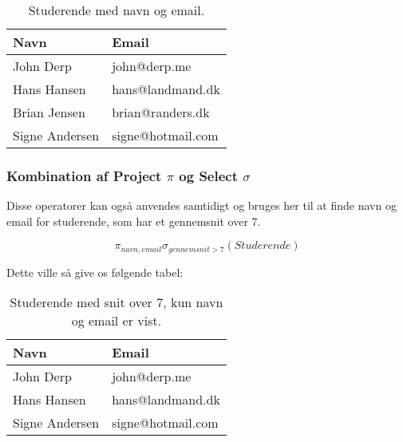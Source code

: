 \begin{table}[H]
	\centering
	\begin{tabular}{ll}
		\toprule
		\textbf{Navn}	& \textbf{Email}	\\
		\midrule
		John Derp		& john@derp.me		\\			
		Hans Hansen		& hans@landmand.dk	\\			
		Brian Jensen	& brian@randers.dk	\\			
		Signe Andersen	& signe@hotmail.com	\\
		\bottomrule
	\end{tabular}
	\caption{Studerende med navn og email.}
\end{table}

\subsubsection{Kombination af Project $\pi$ og Select $\sigma$}

Disse operatorer kan også anvendes samtidigt og bruges her til at finde navn og email for studerende, som har et gennemsnit over 7.

\begin{equation}
\pi_{navn, email}\sigma_{gennemsnit>7}(Studerende)
\end{equation}

Dette ville så give os følgende tabel:

\begin{table}[H]
	\centering
	\begin{tabular}{ll}
		\toprule
		\textbf{Navn}	& \textbf{Email}	\\
		\midrule
		John Derp		& john@derp.me		\\			
		Hans Hansen		& hans@landmand.dk	\\			
		Signe Andersen	& signe@hotmail.com	\\
		\bottomrule
	\end{tabular}
	\caption{Studerende med snit over 7, kun navn og email er vist.}
\end{table}




















